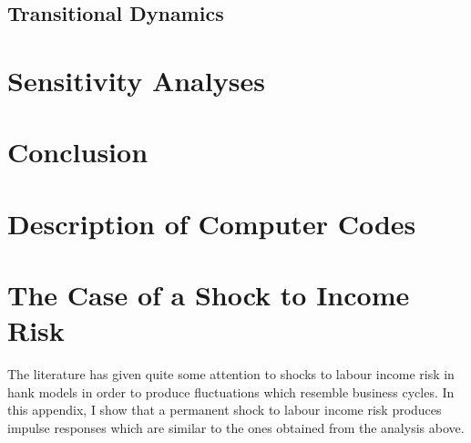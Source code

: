\documentclass[12pt]{article}
\numberwithin{equation}{section} %
\begin{document}
\subsection{Transitional Dynamics}
\label{sec:results-transition}

\section{Sensitivity Analyses}
\label{sec:sensitivity}

\section{Conclusion}
\label{sec:conclusion}

\newpage
\thispagestyle{plain}
\printbibliography[heading=bibintoc] %

\newpage
\thispagestyle{plain}
\renewcommand*{\thepage}{A-\arabic{page}}
\begin{appendices}
\section{Description of Computer Codes}
\label{sec-app:codes}

\section{The Case of a Shock to Income Risk}
\label{sec-app:income}
The literature has given quite some attention to shocks to labour income risk in \Gls{hank} models in order to produce fluctuations which resemble business cycles. In this appendix, I show that a permanent shock to labour income risk produces impulse responses which are similar to the ones obtained from the analysis above.

\end{appendices}

\newpage
\thispagestyle{plain}
\end{document}
